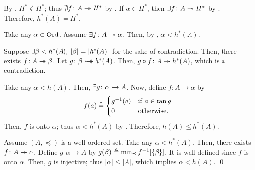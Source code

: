 \documentclass[../introduction_to_set_theory_Note.tex]{subfiles}
\begin{document}
{\begin{enumerate}[nolistsep, label=(\roman*), leftmargin=*, listparindent=\parindent]
    By , \(H^\ast \notin H^\ast\);
    thus \(\nexists f \colon A \twoheadrightarrow H^\ast\) by .
    If \(\alpha \in H^\ast\), then \(\exists f \colon A \twoheadrightarrow H^\ast\)
    by . Therefore, \(h^\ast(A) = H^\ast\).

    \ii
    Take any \(\alpha \in \mathrm{Ord}\).
    Assume \(\exists f \colon A \twoheadrightarrow \alpha\).
    Then, by , \(\alpha < h^\ast(A)\).

    \ii
    Suppose \(\exists \beta < h^\ast(A),\: |\beta| = |h^\ast(A)|\) for the sake of contradiction.
    Then, there exists \(f \colon A \twoheadrightarrow \beta\).
    Let \(g \colon \beta \hookrightarrow\mathrel{\mspace{-15mu}}\rightarrow h^\ast(A)\).
    Then, \(g \circ f \colon A \twoheadrightarrow h^\ast(A)\), which is a contradiction.

    \ii
    Take any \(\alpha < h(A)\).
    Then, \(\exists g \colon \alpha \hookrightarrow A\).
    Now, define \(f \colon A \to \alpha\) by
    \[
        f(a) \triangleq \begin{cases}
            g^{-1}(a) & \text{if}~a \in \operatorname{ran} g \\
            0 & \text{otherwise.}
        \end{cases}
    \]
    Then, \(f\) is onto \(\alpha\); thus \(\alpha < h^\ast(A)\) by .
    Therefore, \(h(A) \le h^\ast(A)\).

    \ii
    Assume \((A, \preceq)\) is a well-ordered set.
    Take any \(\alpha < h^\ast(A)\).
    Then, there exists \(f \colon A \twoheadrightarrow \alpha\).
    Define \(g \colon \alpha \to A\) by
    \(g(\beta) \triangleq \min_{\preceq} f^{-1}[\{\beta\}]\).
    It is well defined since \(f\) is onto \(\alpha\).
    Then, \(g\) is injective; thus \(|\alpha| \le |A|\),
    which implies \(\alpha < h(A)\). \qed
\end{enumerate}
}
\end{document}
